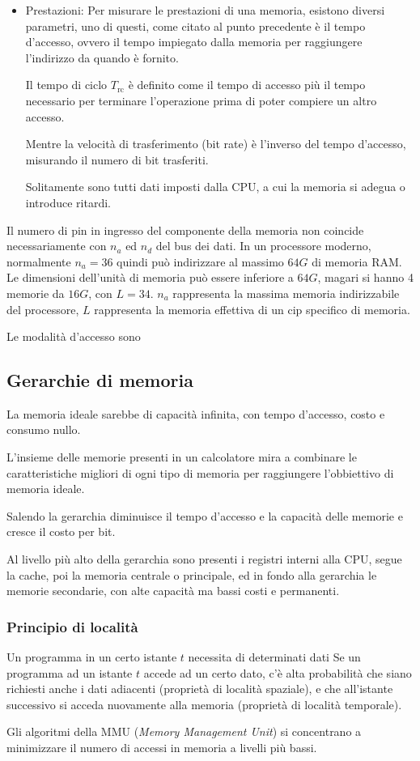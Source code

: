 \documentclass[../template]{subfiles}
\begin{document}
\begin{itemize}
    \item Prestazioni:
        Per misurare le prestazioni di una memoria, esistono diversi parametri, uno di questi, come citato al punto precedente è il tempo d'accesso,  ovvero il tempo impiegato dalla memoria per raggiungere l'indirizzo da quando è fornito.

        Il tempo di ciclo $T_\text{rc}$ è definito come il tempo di accesso più il tempo necessario per terminare l'operazione prima di poter compiere un altro accesso.

        Mentre la velocità di trasferimento (bit rate) è l'inverso del tempo d'accesso, misurando il numero di bit trasferiti.

        Solitamente sono tutti dati imposti dalla CPU, a cui la memoria si adegua o introduce ritardi.

\end{itemize}

Il numero di pin in ingresso del componente della memoria non coincide necessariamente con $n_a$ ed $n_d$ del bus dei dati.
In un processore moderno, normalmente $n_a = 36$ quindi può indirizzare al massimo $64G$ di memoria RAM. Le dimensioni dell'unità di memoria può essere inferiore a $64G$, magari si hanno 4 memorie da $16G$, con $L=34$. $n_a$ rappresenta la massima memoria indirizzabile del processore, $L$ rappresenta la memoria effettiva di un cip specifico di memoria.

Le modalità d'accesso sono


\subsection{Gerarchie di memoria}
La memoria ideale sarebbe di capacità infinita, con tempo d'accesso, costo e consumo nullo.

L'insieme delle memorie presenti in un calcolatore mira a combinare le caratteristiche migliori di ogni tipo di memoria per raggiungere l'obbiettivo di memoria ideale.

Salendo la gerarchia diminuisce il tempo d'accesso e la capacità delle memorie e cresce il costo per bit.

Al livello più alto della gerarchia sono presenti i registri interni alla CPU, segue la cache, poi la memoria centrale o principale, ed in fondo alla gerarchia le memorie secondarie, con alte capacità ma bassi costi e permanenti.
\subsubsection{Principio di località}

Un programma in un certo istante $t$ necessita di determinati dati
Se un programma ad un istante $t$ accede ad un certo dato,
c'è alta probabilità che siano richiesti anche i dati adiacenti (proprietà di località spaziale), e che all'istante successivo si acceda nuovamente alla memoria (proprietà di località temporale).

Gli algoritmi della MMU (\textit{Memory Management Unit}) si concentrano a minimizzare il numero di accessi in memoria a livelli più bassi.
\end{document}
